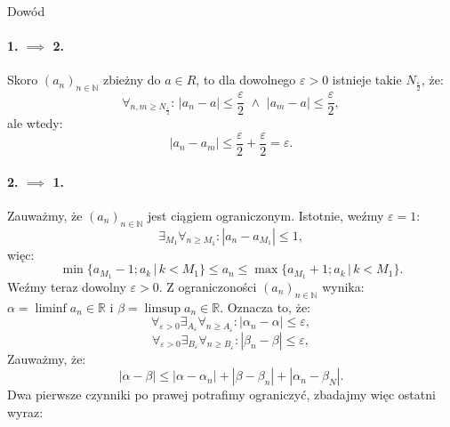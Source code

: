 \documentclass{article}
\numberwithin{defi}{section}
\numberwithin{defi}{section}
\newcommand{\R}{\mathbb{R}}
\newcommand{\N}{\mathbb{N}}
\providecommand{\eps}{\varepsilon}
\newcommand{\ciag}[1]{(#1_{n})_{n \in \N}}
\begin{document}
\begin{dow}{Dowód}
    \paragraph*{1. $\implies$ 2.} Skoro $\ciag{a}$ zbieżny do $a \in R$, to dla dowolnego $\eps >0$ istnieje takie $N_{\frac{\eps}{2}}$, że: \begin{equation}
        \forall_{n, m \geqslant N_{\frac{\eps}{2}}}: \,|a_n - a| \leqslant \frac{\eps}{2} \,\, \land\,\, |a_m - a| \leqslant \frac{\eps}{2},
    \end{equation}
    ale wtedy: \begin{equation}
        |a_n - a_m| \leqslant \frac{\eps}{2} + \frac{\eps}{2} = \eps.
    \end{equation}

    \paragraph*{2. $\implies$ 1.} Zauważmy, że $\ciag{a}$ jest ciągiem ograniczonym. Istotnie, weźmy $\eps = 1$: \begin{equation}
        \exists_{M_1} \forall_{n \geqslant M_1}: |a_n - a_{M_1}| \leqslant 1,
    \end{equation} więc: \begin{equation}
        \min \{ a_{M_1} -1; a_k \, \big| \, k < M_1 \} \leqslant a_n \leqslant \max \{ a_{M_1} +1; a_k \, \big| \, k < M_1 \}.
    \end{equation}
    Weźmy teraz dowolny $\eps > 0$. Z ograniczoności $\ciag{a}$ wynika: $\alpha = \liminf a_n \in \R$ i $\beta = \limsup a_n \in \R$. Oznacza to, że: \begin{equation}
        \forall_{\eps > 0} \exists_{A_\eps} \forall_{n \geqslant A_\eps}: |\alpha_n - \alpha| \leqslant \eps,
    \end{equation} \begin{equation}
        \forall_{\eps > 0} \exists_{B_\eps} \forall_{n \geqslant B_\eps}: |\beta_n - \beta| \leqslant \eps,
    \end{equation}
    Zauważmy, że: \begin{equation}
        |\alpha - \beta| \leqslant |\alpha - \alpha_n| + |\beta - \beta_n| + |\alpha_n - \beta_N|.
    \end{equation}
    Dwa pierwsze czynniki po prawej potrafimy ograniczyć, zbadajmy więc ostatni wyraz: \begin{equation} \begin{split}

\end{split}
\end{equation}
\end{dow}
\end{document}
